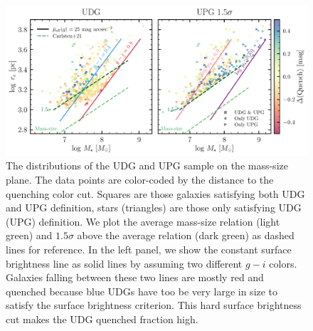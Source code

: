 \documentclass[twocolumn,astrosymb,twocolappendix]{aastex631}
\begin{document}
\begin{CJK*}{UTF8}{gbsn}
\begin{figure}
	\vbox{ 
		\centering
		\includegraphics[width=1\linewidth]{mass_size_plane.pdf}
	}
    \caption{The distributions of the UDG and UPG sample on the mass-size plane. The data points are color-coded by the distance to the quenching color cut. Squares are those galaxies satisfying both UDG and UPG definition, stars (triangles) are those only satisfying UDG (UPG) definition.
    We plot the average mass-size relation (light green) and $1.5\sigma$ above the average relation (dark green) as dashed lines for reference. In the left panel, we show the constant surface brightness line as solid lines by assuming two different $g-i$ colors. Galaxies falling between these two lines are mostly red and quenched because blue UDGs have too be very large in size to satisfy the surface brightness criterion. This hard surface brightness cut makes the UDG quenched fraction high. 
    }
    \label{fig:mass_size}
\end{figure}



\end{CJK*}
\end{document}

